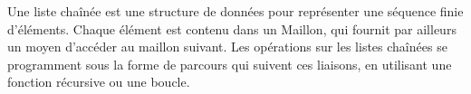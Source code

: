 \documentclass[a4paper,17pt]{extarticle}
\begin{document}
\begin{retenir}
    Une liste chaînée est une structure de données pour représenter une
séquence finie d'éléments. Chaque élément est contenu dans un Maillon,
qui fournit par ailleurs un moyen d'accéder au maillon suivant. Les
opérations sur les listes chaînées se programment sous la forme de
parcours qui suivent ces liaisons, en utilisant une fonction récursive
ou une boucle.

        \end{retenir}

    
    
    
\end{document}
